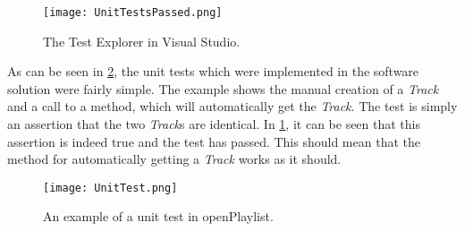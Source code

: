 \begin{figure}[H]
  \centering
  \texttt{[image: UnitTestsPassed.png]}
  \caption{The Test Explorer in Visual Studio.}\label{fig:UnitTestsPassed}
\end{figure}

As can be seen in \cref{fig:UnitTest}, the unit tests which were implemented in the software solution were fairly simple. The example shows the manual creation of a \textit{Track} and a call to a method, which will automatically get the \textit{Track}. The test is simply an assertion that the two \textit{Track}s are identical. In \cref{fig:UnitTestsPassed}, it can be seen that this assertion is indeed true and the test has passed.  This should mean that the method for automatically getting a \textit{Track} works as it should. 

\begin{figure}[htbp]
  \centering
  \texttt{[image: UnitTest.png]}
  \caption{An example of a unit test in openPlaylist.}\label{fig:UnitTest}
\end{figure}
